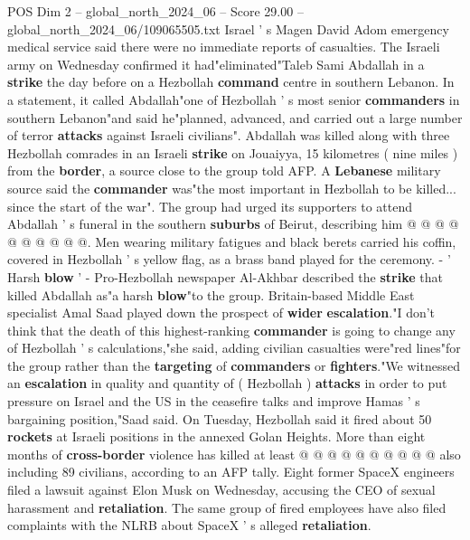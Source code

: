 \begin{textsample}{POS Dim 2 – global\_north\_2024\_06 – Score 29.00 – global\_north\_2024\_06/109065505.txt}
Israel ' s Magen David Adom emergency medical service said there were no immediate reports of casualties.
The Israeli army on Wednesday confirmed it had"eliminated"Taleb Sami Abdallah in a \textbf{strike} the day before on a Hezbollah \textbf{command} centre in southern Lebanon.
In a statement, it called Abdallah"one of Hezbollah ' s most senior \textbf{commanders} in southern Lebanon"and said he"planned, advanced, and carried out a large number of terror \textbf{attacks} against Israeli civilians".
Abdallah was killed along with three Hezbollah comrades in an Israeli \textbf{strike} on Jouaiyya, 15 kilometres ( nine miles ) from the \textbf{border}, a source close to the group told AFP.
A \textbf{Lebanese} military source said the \textbf{commander} was"the most important in Hezbollah to be killed... since the start of the war".
The group had urged its supporters to attend Abdallah ' s funeral in the southern \textbf{suburbs} of Beirut, describing him @ @ @ @ @ @ @ @ @ @.
Men wearing military fatigues and black berets carried his coffin, covered in Hezbollah ' s yellow flag, as a brass band played for the ceremony. - ' Harsh \textbf{blow} ' - Pro-Hezbollah newspaper Al-Akhbar described the \textbf{strike} that killed Abdallah as"a harsh \textbf{blow}"to the group.
Britain-based Middle East specialist Amal Saad played down the prospect of \textbf{wider} \textbf{escalation}."I don't think that the death of this highest-ranking \textbf{commander} is going to change any of Hezbollah ' s calculations,"she said, adding civilian casualties were"red lines"for the group rather than the \textbf{targeting} of \textbf{commanders} or \textbf{fighters}."We witnessed an \textbf{escalation} in quality and quantity of ( Hezbollah ) \textbf{attacks} in order to put pressure on Israel and the US in the ceasefire talks and improve Hamas ' s bargaining position,"Saad said.
On Tuesday, Hezbollah said it fired about 50 \textbf{rockets} at Israeli positions in the annexed Golan Heights.
More than eight months of \textbf{cross-border} violence has killed at least @ @ @ @ @ @ @ @ @ @ also including 89 civilians, according to an AFP tally.
Eight former SpaceX engineers filed a lawsuit against Elon Musk on Wednesday, accusing the CEO of sexual harassment and \textbf{retaliation}.
The same group of fired employees have also filed complaints with the NLRB about SpaceX ' s alleged \textbf{retaliation}.

\end{textsample}
